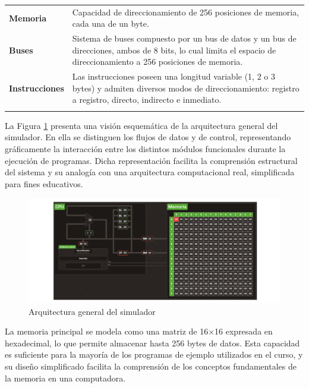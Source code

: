 \documentclass[12pt,oneside]{templates/unerthesis}
\begin{document}
\begin{table}[!h]
{\begin{tabular}[t]{>{\raggedright\arraybackslash}p{6cm}|>{\raggedright\arraybackslash}p{9cm}}
\addlinespace[10pt]
\addlinespace
\textbf{Memoria} & Capacidad de direccionamiento de 256 posiciones de memoria, cada una de un byte.\\
\addlinespace[10pt]
\textbf{Buses} & Sistema de buses compuesto por un bus de datos y un bus de direcciones, ambos de 8 bits, lo cual limita el espacio de direccionamiento a 256 posiciones de memoria.\\
\addlinespace[10pt]
\textbf{Instrucciones} & Las instrucciones poseen una longitud variable (1, 2 o 3 bytes) y admiten diversos modos de direccionamiento: registro a registro, directo, indirecto e inmediato.\\
\addlinespace[10pt]
\bottomrule
\end{tabular}}
\end{table}

La Figura \ref{fig:esquemavonsim8} presenta una visión esquemática de la arquitectura general del simulador. En ella se distinguen los flujos de datos y de control, representando gráficamente la interacción entre los distintos módulos funcionales durante la ejecución de programas. Dicha representación facilita la comprensión estructural del sistema y su analogía con una arquitectura computacional real, simplificada para fines educativos.

\begin{figure}

{\centering \includegraphics[width=0.85\linewidth]{images/esquemavonsim8} 

}

\caption{Arquitectura general del simulador}\label{fig:esquemavonsim8}
\end{figure}

La memoria principal se modela como una matriz de 16×16 expresada en hexadecimal, lo que permite almacenar hasta 256 bytes de datos. Esta capacidad es suficiente para la mayoría de los programas de ejemplo utilizados en el curso, y su diseño simplificado facilita la comprensión de los conceptos fundamentales de la memoria en una computadora.
\end{document}
